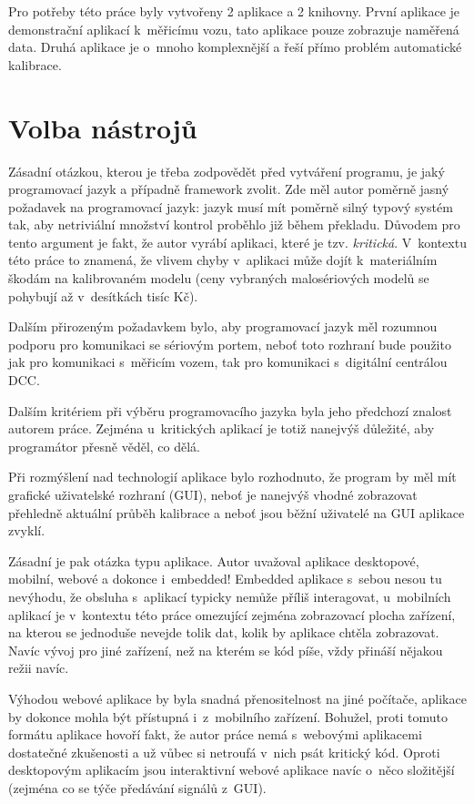 Pro potřeby této práce byly vytvořeny 2 aplikace a 2 knihovny. První aplikace je
demonstrační aplikací k~měřicímu vozu, tato aplikace pouze zobrazuje naměřená
data. Druhá aplikace je o~mnoho komplexnější a řeší přímo problém automatické
kalibrace.

\section{Volba nástrojů}
\label{sec:sw-nastroje}

Zásadní otázkou, kterou je třeba zodpovědět před vytváření programu, je
jaký programovací jazyk a případně framework zvolit. Zde měl autor poměrně
jasný požadavek na programovací jazyk: jazyk musí mít poměrně silný typový
systém tak, aby netriviální množství kontrol proběhlo již během překladu.
Důvodem pro tento argument je fakt, že autor vyrábí aplikaci, které je tzv.
\textit{kritická}. V~kontextu této práce to znamená, že vlivem chyby
v~aplikaci může dojít k~materiálním škodám na kalibrovaném modelu (ceny
vybraných malosériových modelů se pohybují až v~desítkách tisíc Kč).

Dalším přirozeným požadavkem bylo, aby programovací jazyk měl rozumnou podporu
pro komunikaci se sériovým portem, neboť toto rozhraní bude použito jak pro
komunikaci s~měřicím vozem, tak pro komunikaci s~digitální centrálou DCC.

Dalším kritériem při výběru programovacího jazyka byla jeho předchozí znalost
autorem práce. Zejména u~kritických aplikací je totiž nanejvýš důležité, aby
programátor přesně věděl, co dělá.

Při rozmýšlení nad technologií aplikace bylo rozhodnuto, že program by měl
mít grafické uživatelské rozhraní (GUI), neboť je nanejvýš vhodné zobrazovat
přehledně aktuální průběh kalibrace a neboť jsou běžní uživatelé na GUI
aplikace zvyklí.

Zásadní je pak otázka typu aplikace. Autor uvažoval aplikace desktopové,
mobilní, webové a dokonce i~embedded! Embedded aplikace s~sebou nesou tu
nevýhodu, že obsluha s~aplikací typicky nemůže příliš interagovat, u~mobilních
aplikací je v~kontextu této práce omezující zejména zobrazovací plocha
zařízení, na kterou se jednoduše nevejde tolik dat, kolik by aplikace chtěla
zobrazovat. Navíc vývoj pro jiné zařízení, než na kterém se kód píše, vždy
přináší nějakou režii navíc.

Výhodou webové aplikace by byla snadná přenositelnost na jiné počítače,
aplikace by dokonce mohla být přístupná i~z~mobilního zařízení. Bohužel, proti
tomuto formátu aplikace hovoří fakt, že autor práce nemá s~webovými aplikacemi
dostatečné zkušenosti a už vůbec si netroufá v~nich psát kritický kód.
Oproti desktopovým aplikacím jsou interaktivní webové aplikace navíc o~něco
složitější (zejména co se týče předávání signálů z~GUI).

